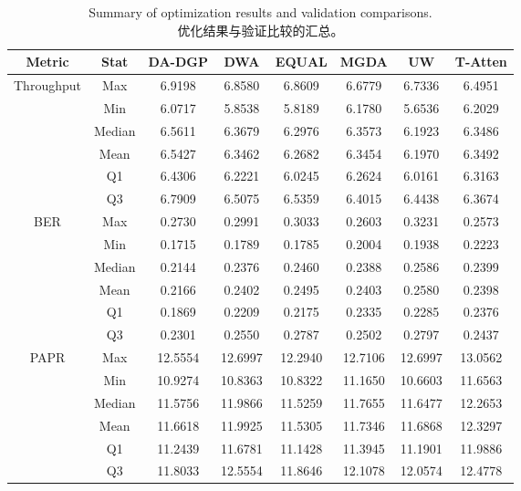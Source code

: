 \documentclass[11pt]{article}
\newcommand{\bicaption}[2]{\caption[#1]{#1\protect\\#2}}
\begin{document}
\begin{table}[!h]
	\centering
	\bicaption{Summary of optimization results and validation comparisons.}{优化结果与验证比较的汇总。}
	\label{tab:sim_results}
	\begin{tabular*}{\textwidth}{@{\extracolsep{\fill}}cccccccc}
		\toprule
		\textbf{Metric} & \textbf{Stat} & \textbf{DA-DGP} & \textbf{DWA} & \textbf{EQUAL} & \textbf{MGDA} & \textbf{UW} & \textbf{T-Atten} \\
		\midrule
		\multirow{6}{*}{Throughput} 
		& Max    & 6.9198 & 6.8580 & 6.8609 & 6.6779 & 6.7336 & 6.4951 \\
		& Min    & 6.0717 & 5.8538 & 5.8189 & 6.1780 & 5.6536 & 6.2029 \\
		& Median & 6.5611 & 6.3679 & 6.2976 & 6.3573 & 6.1923 & 6.3486 \\
		& Mean   & 6.5427 & 6.3462 & 6.2682 & 6.3454 & 6.1970 & 6.3492 \\
		& Q1     & 6.4306 & 6.2221 & 6.0245 & 6.2624 & 6.0161 & 6.3163 \\
		& Q3     & 6.7909 & 6.5075 & 6.5359 & 6.4015 & 6.4438 & 6.3674 \\
		\midrule
		\multirow{6}{*}{BER} 
		& Max    & 0.2730 & 0.2991 & 0.3033 & 0.2603 & 0.3231 & 0.2573 \\
		& Min    & 0.1715 & 0.1789 & 0.1785 & 0.2004 & 0.1938 & 0.2223 \\
		& Median & 0.2144 & 0.2376 & 0.2460 & 0.2388 & 0.2586 & 0.2399 \\
		& Mean   & 0.2166 & 0.2402 & 0.2495 & 0.2403 & 0.2580 & 0.2398 \\
		& Q1     & 0.1869 & 0.2209 & 0.2175 & 0.2335 & 0.2285 & 0.2376 \\
		& Q3     & 0.2301 & 0.2550 & 0.2787 & 0.2502 & 0.2797 & 0.2437 \\
		\midrule
		\multirow{6}{*}{PAPR}    
		& Max    & 12.5554 & 12.6997 & 12.2940 & 12.7106 & 12.6997 & 13.0562 \\
		& Min    & 10.9274 & 10.8363 & 10.8322 & 11.1650 & 10.6603 & 11.6563 \\
		& Median & 11.5756 & 11.9866 & 11.5259 & 11.7655 & 11.6477 & 12.2653 \\
		& Mean   & 11.6618 & 11.9925 & 11.5305 & 11.7346 & 11.6868 & 12.3297 \\
		& Q1     & 11.2439 & 11.6781 & 11.1428 & 11.3945 & 11.1901 & 11.9886 \\
		& Q3     & 11.8033 & 12.5554 & 11.8646 & 12.1078 & 12.0574 & 12.4778 \\
		\bottomrule
	\end{tabular*}
\end{table}
\end{document}
